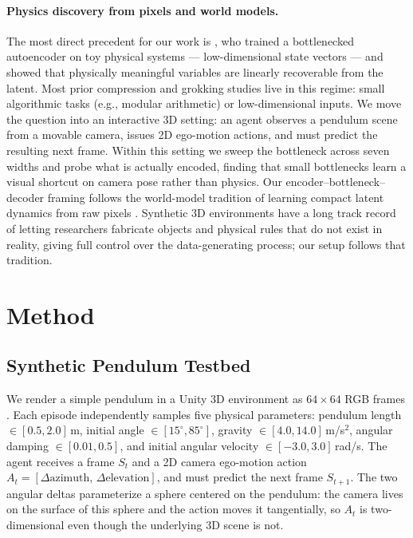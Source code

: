\documentclass[letterpaper]{article} %
\begin{document}
\paragraph{Physics discovery from pixels and world models.}
The most direct precedent for our work is \citet{iten2020discovering}, who trained a bottlenecked autoencoder on toy physical systems --- low-dimensional state vectors --- and showed that physically meaningful variables are linearly recoverable from the latent. Most prior compression and grokking studies live in this regime: small algorithmic tasks (e.g., modular arithmetic) or low-dimensional inputs. We move the question into an interactive 3D setting: an agent observes a pendulum scene from a movable camera, issues 2D ego-motion actions, and must predict the resulting next frame. Within this setting we sweep the bottleneck across seven widths and probe what is actually encoded, finding that small bottlenecks learn a visual shortcut on camera pose rather than physics. Our encoder--bottleneck--decoder framing follows the world-model tradition of learning compact latent dynamics from raw pixels \citep{ha2018world, hafner2023dreamer}. Synthetic 3D environments \citep{juliani2018unity} have a long track record of letting researchers fabricate objects and physical rules that do not exist in reality, giving full control over the data-generating process; our setup follows that tradition.

\section{Method}

\subsection{Synthetic Pendulum Testbed}
\label{sec:testbed}

We render a simple pendulum in a Unity 3D environment as $64\times64$ RGB frames \citep{juliani2018unity}. Each episode independently samples five physical parameters: pendulum length $\in [0.5, 2.0]$\,m, initial angle $\in [15^\circ, 85^\circ]$, gravity $\in [4.0, 14.0]$\,m/s$^2$, angular damping $\in [0.01, 0.5]$, and initial angular velocity $\in [-3.0, 3.0]$\,rad/s. The agent receives a frame $S_t$ and a 2D camera ego-motion action $A_t = [\Delta\text{azimuth},\,\Delta\text{elevation}]$, and must predict the next frame $S_{t+1}$. The two angular deltas parameterize a sphere centered on the pendulum: the camera lives on the surface of this sphere and the action moves it tangentially, so $A_t$ is two-dimensional even though the underlying 3D scene is not.
\end{document}
